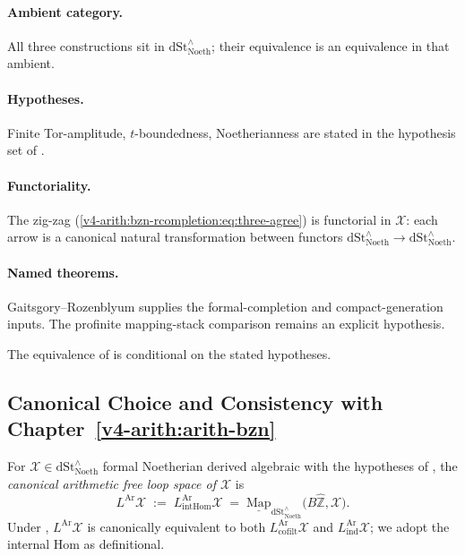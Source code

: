 \paragraph{Ambient category.} All three constructions sit in
\(\mathrm{dSt}^{\wedge}_{\mathrm{Noeth}}\); their equivalence is
an equivalence in that ambient.

\paragraph{Hypotheses.} Finite Tor-amplitude, \(t\)-boundedness,
Noetherianness are stated in the hypothesis set of
.

\paragraph{Functoriality.} The zig-zag
(\ref{v4-arith:bzn-rcompletion:eq:three-agree})
is functorial in \(\mathcal{X}\): each arrow is a canonical natural
transformation between functors
\(\mathrm{dSt}^{\wedge}_{\mathrm{Noeth}}\to\mathrm{dSt}^{\wedge}_{\mathrm{Noeth}}\).

\paragraph{Named theorems.} Gaitsgory--Rozenblyum supplies the
formal-completion and compact-generation inputs.  The profinite
mapping-stack comparison remains an explicit hypothesis.

The equivalence of
 is conditional on
the stated hypotheses.

\subsection{Canonical Choice and Consistency with Chapter~\ref{v4-arith:arith-bzn}}

\begin{definition}
\label{v4-arith:bzn-rcompletion:def:canonical-L-Ar}
For \(\mathcal{X}\in\mathrm{dSt}^{\wedge}_{\mathrm{Noeth}}\) formal
Noetherian derived algebraic with the hypotheses of
, the
\emph{canonical arithmetic free loop space of \(\mathcal{X}\)} is
\begin{equation}
L^{\mathrm{Ar}}\mathcal{X}\;:=\;L^{\mathrm{Ar}}_{\mathrm{intHom}}\mathcal{X}
\;=\;\underline{\mathrm{Map}}_{\mathrm{dSt}^{\wedge}_{\mathrm{Noeth}}}\bigl(B\widehat{\mathbb{Z}},\mathcal{X}\bigr).
\end{equation}
Under
,
\(L^{\mathrm{Ar}}\mathcal{X}\) is canonically equivalent to both
\(L^{\mathrm{Ar}}_{\mathrm{cofilt}}\mathcal{X}\) and
\(L^{\mathrm{Ar}}_{\mathrm{ind}}\mathcal{X}\); we adopt the internal
Hom as definitional.
\end{definition}

